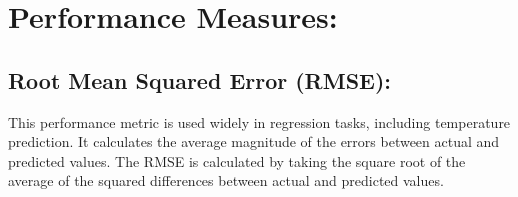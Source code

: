 







\section{Performance Measures:}
\subsection{Root Mean Squared Error (RMSE):}
This performance metric is used widely in regression tasks, including temperature prediction. It calculates the average magnitude of the errors between actual and predicted values. The RMSE is calculated by taking the square root of the average of the squared differences between actual and predicted values.

